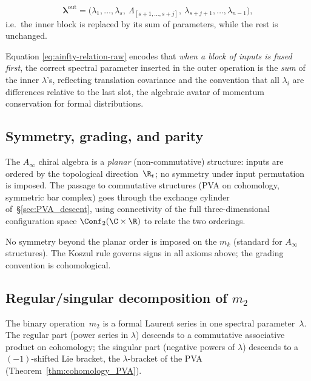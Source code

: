 \begin{definition}
\begin{itemize}
 \[
 \bm\lambda^{\mathrm{out}} = \bigl(\lambda_1,\dots,\lambda_s,\ \Lambda_{[s+1,\dots,s+j]},\ \lambda_{s+j+1},\dots,\lambda_{n-1}\bigr),
 \]
 i.e.\ the inner block is replaced by its sum of parameters, while the rest is unchanged.
\end{itemize}
\begin{remark}
\label{rmk:spectral-substitution}
Equation \eqref{eq:ainfty-relation-raw} encodes that \emph{when a block of inputs is fused first}, the correct spectral parameter inserted in the outer operation is the \emph{sum} of the inner $\lambda$'s, reflecting translation covariance and the convention that all $\lambda_i$ are differences relative to the last slot, the algebraic avatar of momentum conservation for formal distributions.
\end{remark}
\end{definition}

\subsection{Symmetry, grading, and parity}
\label{subsec:symmetry}

The $A_\infty$ chiral algebra is a \emph{planar} (non-commutative) structure: inputs are ordered by the topological direction~$\R_t$; no symmetry under input permutation is imposed. The passage to commutative structures (PVA on cohomology, symmetric bar complex) goes through the exchange cylinder of~\S\ref{sec:PVA_descent}, using connectivity of the full three-dimensional configuration space $\Conf_2(\C \times \R)$ to relate the two orderings.

\begin{definition}
\label{def:symmetry-grading}
No symmetry beyond the planar order is imposed on the $m_k$ (standard for $A_\infty$ structures). The Koszul rule governs signs in all axioms above; the grading convention is cohomological.
\end{definition}

\subsection{Regular/singular decomposition of $m_2$}
\label{subsec:reg-sing}
\label{def:Laurent-projection}

The binary operation~$m_2$ is a formal Laurent series in one spectral
parameter~$\lambda$. The regular part (power series in $\lambda$)
descends to a commutative associative product on cohomology; the
singular part (negative powers of $\lambda$) descends to a
$(-1)$-shifted Lie bracket, the $\lambda$-bracket of the PVA
(Theorem~\ref{thm:cohomology_PVA}).


